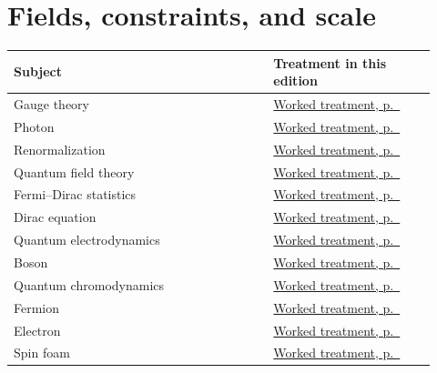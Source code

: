 \documentclass[11pt,oneside]{book}
\begin{document}
\section*{Fields, constraints, and scale}
\begin{longtable}{p{0.57\linewidth}p{0.35\linewidth}}
\toprule Subject & Treatment in this edition \\
\midrule\endhead
{}\label{index:gauge-theory}Gauge theory & \hyperref[topic:gauge-theory]{Worked treatment, p.~\pageref*{topic:gauge-theory}} \\
\label{index:photon}Photon & \hyperref[topic:photon]{Worked treatment, p.~\pageref*{topic:photon}} \\
\label{index:renormalization}Renormalization & \hyperref[topic:renormalization]{Worked treatment, p.~\pageref*{topic:renormalization}} \\
\label{index:quantum-field-theory}Quantum field theory & \hyperref[topic:quantum-field-theory]{Worked treatment, p.~\pageref*{topic:quantum-field-theory}} \\
\label{index:fermi-dirac-statistics}Fermi–Dirac statistics & \hyperref[topic:fermi-dirac-statistics]{Worked treatment, p.~\pageref*{topic:fermi-dirac-statistics}} \\
\label{index:dirac-equation}Dirac equation & \hyperref[topic:dirac-equation]{Worked treatment, p.~\pageref*{topic:dirac-equation}} \\
\label{index:quantum-electrodynamics}Quantum electrodynamics & \hyperref[topic:quantum-electrodynamics]{Worked treatment, p.~\pageref*{topic:quantum-electrodynamics}} \\
\label{index:boson}Boson & \hyperref[topic:boson]{Worked treatment, p.~\pageref*{topic:boson}} \\
\label{index:quantum-chromodynamics}Quantum chromodynamics & \hyperref[topic:quantum-chromodynamics]{Worked treatment, p.~\pageref*{topic:quantum-chromodynamics}} \\
\label{index:fermion}Fermion & \hyperref[topic:fermion]{Worked treatment, p.~\pageref*{topic:fermion}} \\
\label{index:electron}Electron & \hyperref[topic:electron]{Worked treatment, p.~\pageref*{topic:electron}} \\
\label{index:spin-foam}Spin foam & \hyperref[topic:spin-foam]{Worked treatment, p.~\pageref*{topic:spin-foam}} \\

\end{longtable}
\end{document}
